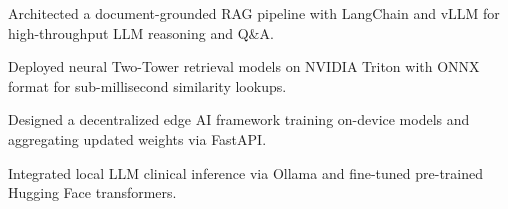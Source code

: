 \documentclass[../main.tex]{subfiles}
\begin{document}
\begin{tightemize}
\item Architected a document-grounded RAG pipeline with LangChain and vLLM for high-throughput LLM reasoning and Q\&A.
\item Deployed neural Two-Tower retrieval models on NVIDIA Triton with ONNX format for sub-millisecond similarity lookups.
\end{tightemize}
\sectionsep

\begin{tightemize}
\item Designed a decentralized edge AI framework training on-device models and aggregating updated weights via FastAPI.
\item Integrated local LLM clinical inference via Ollama and fine-tuned pre-trained Hugging Face transformers.
\end{tightemize}
\end{document}
